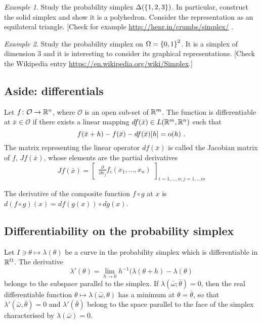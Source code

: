 \documentclass[12pt,a4paper]{amsart}
\theoremstyle{plain}%
\theoremstyle{definition}
\theoremstyle{remark}
\newtheorem{example}{Example}
\begin{document}
\begin{example}
  Study the probability simplex $\Delta(\left\{1,2,3\right\})$. In particular, construct the solid simplex and show it is a polyhedron. Consider the representation as an equilateral triangle. [Check for example \url{http://henr.in/crumbs/simplex/}
.\end{example}

\begin{example}
  Study the probability simplex on $\Omega = \left\{0,1\right\}^2$. It is a simplex of dimension 3 and it is interesting to consider its graphical representations. [Check the Wikipedia entry \url{https://en.wikipedia.org/wiki/Simplex}.]
\end{example}

\subsection{Aside: differentials}
Let $f \colon \mathcal O \to \mathbb{R}^n$, where $\mathcal O$ is an open sub-set of $\mathbb{R}^m$. The function is differentiable at $\bar x \in \mathcal O$ if there exists a linear mapping $df(\bar x) \in L(\mathbb{R}^m,\mathbb{R}^n)$ such that
\begin{equation*}
f(\bar x + h) - f(\bar x) - df(\bar x)[h] = \operatorname{o}(h) \ .
\end{equation*}
The matrix representing the linear operator $df(\bar x)$ is called the Jacobian matrix of $f$, $Jf(\bar x)$, whose elements are the partial derivatives
\begin{equation*}
  Jf(\bar x) =
  \begin{bmatrix}
    \frac{\partial}{\partial x_j} f_i(x_1,\dots,x_n)
  \end{bmatrix}_{i=1,\dots,n; j=1,\dots m}
\end{equation*}

The derivative of the composite function $f \circ g$ at $x$ is $d(f\circ g)(x) = df(g(x)) \circ dg(x)$.

\subsection{Differentiability on the probability simplex} Let $I \ni \theta \mapsto \lambda(\theta)$ be a curve in the probability simplex  which is differentiable in $\mathbb{R}^\Omega$. The derivative
\begin{equation*}
\lambda'(\theta) = \lim_{h \to 0} h^{-1} (\lambda(\theta+h) - \lambda(\theta)
\end{equation*}
belongs to the subspace parallel to the simplex. If $\lambda(\bar \omega;\bar \theta) = 0$, then the real differentiable function $\theta \mapsto \lambda(\bar\omega,\theta)$ has a minimum at $\theta=\bar\theta$, so that $\lambda'(\bar\omega,\bar\theta)=0$ and $\lambda'(\bar\theta)$ belong to the space parallel to the face of the simplex characterised by $\lambda(\bar\omega) = 0$.
\end{document}
